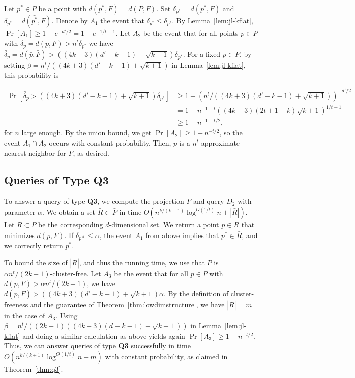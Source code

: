 \documentclass[a4paper,11pt]{paper}
\newcommand{\lowdimapprox}[1][]{(4k+3)(d#1-k-1)+\sqrt{k+1}}
\begin{document}
Let $p^* \in P$ be a point with $d(p^*,F) = d(P,F)$.
Set $\delta_{p^*} = d(p^*,F)$ and
$\bar{\delta}_{p^*} = d(\bar{p^*}, \bar{F})$.
Denote by $A_1$ the event that $\bar{\delta}_{p^*} \leq \delta_{p^*}$.
By Lemma~\ref{lem:jl-kflat},
$\Pr[A_1] \geq 1 - e^{-d'/2} = 1 - e^{-1/t - 1}$.
Let $A_2$ be the event that for all points $p \in P$ with
$\delta_{p} = d(p, F) > n^t \delta_{p^*}$ we have
$\bar{\delta}_{p} = d(\bar{p},\bar{F}) >
(\lowdimapprox['])\delta_{p^*}$.
For a fixed $p \in P$, by setting $\beta = n^t/(\lowdimapprox['])$
in Lemma~\ref{lem:jl-kflat},
this probability is

\begin{align*}
  \Pr[\bar{\delta}_{p} > (\lowdimapprox['])\delta_{p^*}]  &
  \geq 1 - (n^t/(\lowdimapprox[']))^{-d'/2} \\
  & = 1 - n^{-1 - t}((4k+3)(2t+1-k)\sqrt{k+1})^{1/t+1} \\
  &\geq   1  - n^{-1 - t/2},
\end{align*}
for $n$ large enough. By the union bound, we
get $\Pr[A_2] \geq 1 - n^{-t/2}$, so the event $A_1 \cap A_2$ occurs
with constant probability. Then, $p$ is a
$n^t$-approximate nearest neighbor for $F$, as desired.


\subsection{Queries of Type Q3}

To answer a query of type \textbf{Q3},
we compute the projection $\bar{F}$ and query $D_2$ with parameter
$\alpha$. We obtain
a set $\bar{R} \subset \bar{P}$ in time
$O(n^{k/(k+1)}\log^{O(1/t)} n + |\bar{R}|)$.
Let $R \subset P$ be the corresponding $d$-dimensional set.
We return a point $p \in R$ that minimizes $d(p,F)$.
If $\delta_{p*} \leq \alpha$, the event $A_1$ from above implies
that $\bar{p^*} \in \bar{R}$, and we correctly return $p^*$.

To bound the size of $|\bar{R}|$, and thus the running time, we use
that $P$ is $\alpha n^t/(2k+1)$-cluster-free.
Let $A_3$ be the event that for all $p \in P$ with
$d(p,F) > \alpha n^t/(2k+1)$, we have
$d(\bar{p}, \bar{F}) > (\lowdimapprox['])\alpha$.
By the definition of cluster-freeness and the guarantee of
Theorem~\ref{thm:lowdimstructure}, we have $|\bar{R}| = m$ in
the case of $A_3$.
Using $\beta = n^t/((2k+1)(\lowdimapprox))$ in Lemma~\ref{lem:jl-kflat}
and doing
a similar calculation as above yields again $\Pr[A_3] \geq 1 - n^{-t/2}$.
Thus, we can answer queries of type \textbf{Q3} successfully
in time $O(n^{k/(k+1)}\log^{O(1/t)}n + m)$ with constant probability,
as claimed in
Theorem~\ref{thm:q3}.
\end{document}
